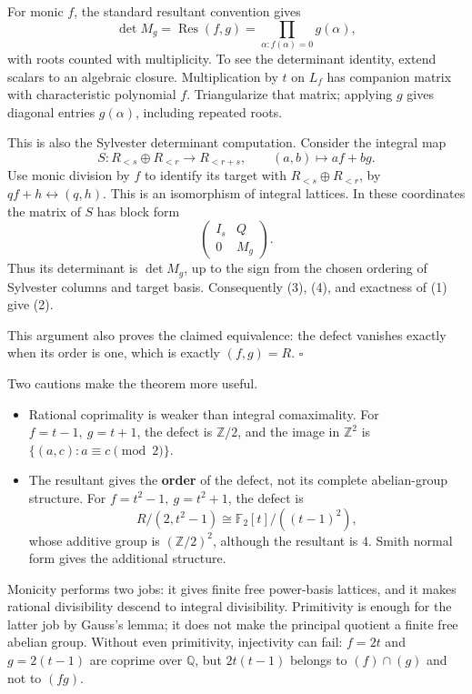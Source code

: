 \documentclass[
  11pt,
]{article}
\providecommand{\tightlist}{%
  \setlength{\itemsep}{0pt}\setlength{\parskip}{0pt}}
\begin{document}
For monic \(f\), the standard resultant convention gives \[
 \det M_g=\operatorname{Res}(f,g)
         =\prod_{\alpha:f(\alpha)=0}g(\alpha),               \tag{4}
\] with roots counted with multiplicity. To see the determinant
identity, extend scalars to an algebraic closure. Multiplication by
\(t\) on \(L_f\) has companion matrix with characteristic polynomial
\(f\). Triangularize that matrix; applying \(g\) gives diagonal entries
\(g(\alpha)\), including repeated roots.

This is also the Sylvester determinant computation. Consider the
integral map \[
 S:R_{<s}\oplus R_{<r}\longrightarrow R_{<r+s},
       \qquad (a,b)\longmapsto af+bg.
\] Use monic division by \(f\) to identify its target with
\(R_{<s}\oplus R_{<r}\), by \(qf+h\leftrightarrow(q,h)\). This is an
isomorphism of integral lattices. In these coordinates the matrix of
\(S\) has block form \[
 \begin{pmatrix} I_s&Q\\0&M_g\end{pmatrix}.
\] Thus its determinant is \(\det M_g\), up to the sign from the chosen
ordering of Sylvester columns and target basis. Consequently (3), (4),
and exactness of (1) give (2).

This argument also proves the claimed equivalence: the defect vanishes
exactly when its order is one, which is exactly \((f,g)=R\). \(\square\)

Two cautions make the theorem more useful.

\begin{itemize}
\tightlist
\item
  Rational coprimality is weaker than integral comaximality. For
  \(f=t-1,\ g=t+1\), the defect is \(\mathbb Z/2\), and the image in
  \(\mathbb Z^2\) is \(\{(a,c):a\equiv c\pmod2\}\).
\item
  The resultant gives the \textbf{order} of the defect, not its complete
  abelian-group structure. For \(f=t^2-1,\ g=t^2+1\), the defect is \[
    R/(2,t^2-1)\cong\mathbb F_2[t]/((t-1)^2),
  \] whose additive group is \((\mathbb Z/2)^2\), although the resultant
  is \(4\). Smith normal form gives the additional structure.
\end{itemize}

Monicity performs two jobs: it gives finite free power-basis lattices,
and it makes rational divisibility descend to integral divisibility.
Primitivity is enough for the latter job by Gauss's lemma; it does not
make the principal quotient a finite free abelian group. Without even
primitivity, injectivity can fail: \(f=2t\) and \(g=2(t-1)\) are coprime
over \(\mathbb Q\), but \(2t(t-1)\) belongs to \((f)\cap(g)\) and not to
\((fg)\).
\end{document}
